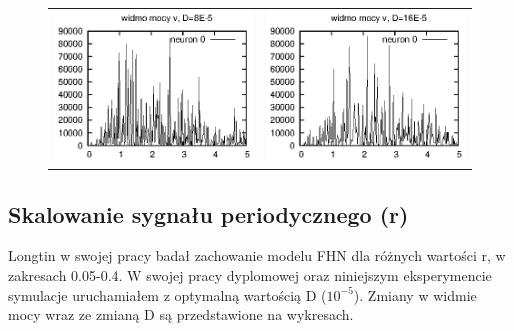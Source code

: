 \documentclass[12pt]{article}
\begin{document}
\begin{figure}
\begin{tabular}{cc}
    \includegraphics{referat_graph/D8e-5_2.eps} &
    \includegraphics{referat_graph/D16e-5.eps} 
  \end{tabular}
  \end{figure}


  \subsection{Skalowanie sygnału periodycznego (r)}

  Longtin w swojej pracy badał zachowanie modelu FHN dla różnych wartości r, w zakresach 0.05-0.4. W swojej pracy dyplomowej oraz niniejszym eksperymencie symulacje uruchamiałem z optymalną wartością D ($10^{-5}$). Zmiany w widmie mocy wraz ze zmianą D są przedstawione na wykresach.
\end{document}
